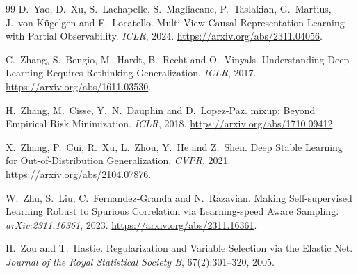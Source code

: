 \documentclass{article}
\begin{document}
\begin{thebibliography}{99}
D.~Yao, D.~Xu, S.~Lachapelle, S.~Magliacane, P.~Taslakian, G.~Martius, J.~von K\"ugelgen and F.~Locatello.
Multi-View Causal Representation Learning with Partial Observability. \emph{ICLR}, 2024.
\url{https://arxiv.org/abs/2311.04056}.

C.~Zhang, S.~Bengio, M.~Hardt, B.~Recht and O.~Vinyals.
Understanding Deep Learning Requires Rethinking Generalization. \emph{ICLR}, 2017.
\url{https://arxiv.org/abs/1611.03530}.

H.~Zhang, M.~Cisse, Y.~N.~Dauphin and D.~Lopez-Paz.
mixup: Beyond Empirical Risk Minimization. \emph{ICLR}, 2018.
\url{https://arxiv.org/abs/1710.09412}.

X.~Zhang, P.~Cui, R.~Xu, L.~Zhou, Y.~He and Z.~Shen.
Deep Stable Learning for Out-of-Distribution Generalization. \emph{CVPR}, 2021.
\url{https://arxiv.org/abs/2104.07876}.

W.~Zhu, S.~Liu, C.~Fernandez-Granda and N.~Razavian.
Making Self-supervised Learning Robust to Spurious Correlation via Learning-speed Aware Sampling.
\emph{arXiv:2311.16361}, 2023. \url{https://arxiv.org/abs/2311.16361}.

H.~Zou and T.~Hastie.
Regularization and Variable Selection via the Elastic Net.
\emph{Journal of the Royal Statistical Society B}, 67(2):301--320, 2005.

\end{thebibliography}
\endgroup
\end{document}
